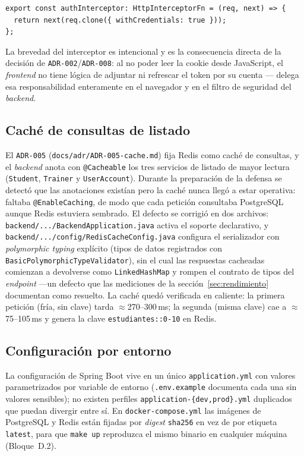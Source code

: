 \documentclass[11pt,a4paper]{article}
\newcommand{\ruta}[1]{\texttt{\footnotesize #1}}
\begin{document}
\begin{lstlisting}[caption={Interceptor de autenticación (\ruta{frontend/src/app/auth/auth.interceptor.ts})},label={lst:auth-interceptor}]
export const authInterceptor: HttpInterceptorFn = (req, next) => {
  return next(req.clone({ withCredentials: true }));
};
\end{lstlisting}

La brevedad del interceptor es intencional y es la consecuencia directa
de la decisión de \texttt{ADR-002}/\texttt{ADR-008}: al no poder leer la
cookie desde JavaScript, el \emph{frontend} no tiene lógica de adjuntar
ni refrescar el token por su cuenta — delega esa responsabilidad
enteramente en el navegador y en el filtro de seguridad del
\emph{backend}.

\subsection{Caché de consultas de listado}
\label{sec:cache-adr}

El \texttt{ADR-005} (\ruta{docs/adr/ADR-005-cache.md}) fija Redis como caché de consultas, y el
\emph{backend} anota con \texttt{@Cacheable} los tres servicios de
listado de mayor lectura (\texttt{Student}, \texttt{Trainer} y
\texttt{UserAccount}). Durante la preparación de la defensa se detectó
que las anotaciones existían pero la caché nunca llegó a estar
operativa: faltaba \texttt{@EnableCaching}, de modo que cada petición
consultaba PostgreSQL aunque Redis estuviera sembrado. El defecto se
corrigió en dos archivos: \ruta{backend/.../BackendApplication.java}
activa el soporte declarativo, y \ruta{backend/.../config/RedisCacheConfig.java}
configura el serializador con \emph{polymorphic typing} explícito
(tipos de datos registrados con \texttt{BasicPolymorphicTypeValidator}),
sin el cual las respuestas cacheadas comienzan a devolverse como
\texttt{LinkedHashMap} y rompen el contrato de tipos del \emph{endpoint}
—un defecto que las mediciones de la sección~\ref{sec:rendimiento}
documentan como resuelto. La caché quedó verificada en caliente: la
primera petición (fría, sin clave) tarda $\approx$270--300\,ms; la
segunda (misma clave) cae a $\approx$75--105\,ms y genera la clave
\texttt{estudiantes::0-10} en Redis.

\subsection{Configuración por entorno}

La configuración de Spring Boot vive en un único \ruta{application.yml}
con valores parametrizados por variable de entorno (\ruta{.env.example}
documenta cada una sin valores sensibles); no existen perfiles
\texttt{application-\{dev,prod\}.yml} duplicados que puedan divergir
entre sí. En \ruta{docker-compose.yml} las imágenes de PostgreSQL y
Redis están fijadas por \emph{digest} \texttt{sha256} en vez de por
etiqueta \texttt{latest}, para que \texttt{make up} reproduzca el mismo
binario en cualquier máquina (Bloque~D.2).
\end{document}
